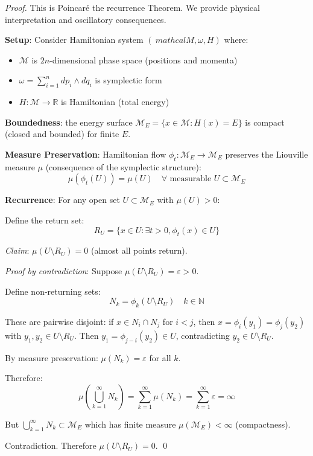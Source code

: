 \documentclass[11pt,onecolumn]{article}
\begin{document}
\begin{proof}
This is Poincar\'e the recurrence Theorem. We provide physical interpretation and oscillatory consequences.

\textbf{Setup}: Consider Hamiltonian system $(\ mathcal{M}, \omega, H)$ where:
\begin{itemize}
\item $\mathcal{M}$ is $2n$-dimensional phase space (positions and momenta)
\item $\omega = \sum_{i=1}^{n} dp_i \wedge dq_i$ is symplectic form
\item $H: \mathcal{M} \to \mathbb{R}$ is Hamiltonian (total energy)
\end{itemize}

\textbf{Boundedness}: the energy surface $\mathcal{M}_E = \{x \in \mathcal{M} : H(x) = E\}$ is compact (closed and bounded) for finite $E$.

\textbf{Measure Preservation}: Hamiltonian flow $\phi_t: \mathcal{M}_E \to \mathcal{M}_E$ preserves the Liouville measure $\mu$ (consequence of the symplectic structure):
\begin{equation}
\mu(\phi_t(U)) = \mu(U) \quad \forall \text{ measurable } U \subset \mathcal{M}_E
\end{equation}

\textbf{Recurrence}: For any open set $U \subset \mathcal{M}_E$ with $\mu(U) > 0$:

Define the return set:
\begin{equation}
R_U = \{x \in U : \exists t > 0, \phi_t(x) \in U\}
\end{equation}

\textit{Claim}: $\mu(U \setminus R_U) = 0$ (almost all points return).

\textit{Proof by contradiction}: Suppose $\mu(U \setminus R_U) = \varepsilon > 0$.

Define non-returning sets:
\begin{equation}
N_k = \phi_k(U \setminus R_U) \quad k \in \mathbb{N}
\end{equation}

These are pairwise disjoint: if $x \in N_i \cap N_j$ for $i < j$, then $x = \phi_i(y_1) = \phi_j(y_2)$ with $y_1, y_2 \in U \setminus R_U$. Then $y_1 = \phi_{j-i}(y_2) \in U$, contradicting $y_2 \in U \setminus R_U$.

By measure preservation: $\mu(N_k) = \varepsilon$ for all $k$.

Therefore:
\begin{equation}
\mu\left(\bigcup_{k=1}^{\infty} N_k\right) = \sum_{k=1}^{\infty} \mu(N_k) = \sum_{k=1}^{\infty} \varepsilon = \infty
\end{equation}

But $\bigcup_{k=1}^{\infty} N_k \subset \mathcal{M}_E$ which has finite measure $\mu(\mathcal{M}_E) < \infty$ (compactness).

Contradiction. Therefore $\mu(U \setminus R_U) = 0$. \qed
\end{proof}
\end{document}
